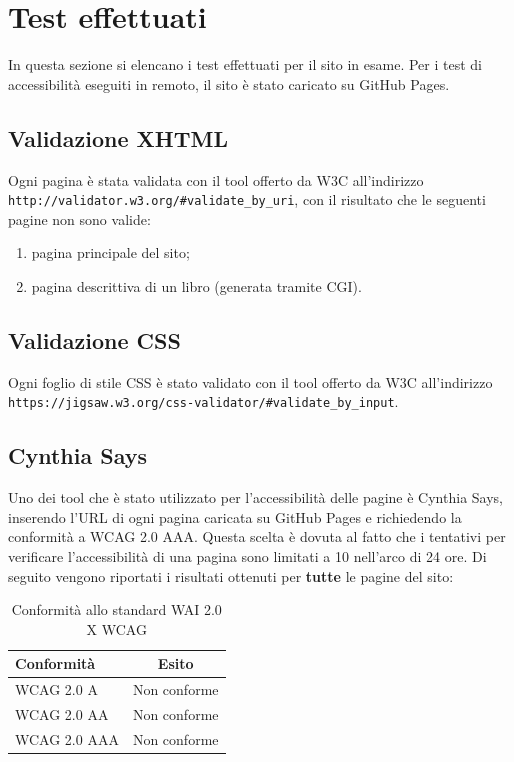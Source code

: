 \section{Test effettuati} %
In questa sezione si elencano i test effettuati per il sito in esame.
Per i test di accessibilità eseguiti in remoto, il sito è stato caricato su
GitHub Pages.

\subsection{Validazione XHTML} %
Ogni pagina è stata validata con il tool offerto da W3C all'indirizzo
\texttt{http://validator.w3.org/\#validate\_by\_uri}, con il risultato che
le seguenti pagine non sono valide:
\begin{enumerate}
\item pagina principale del sito;
\item pagina descrittiva di un libro (generata tramite CGI).
\end{enumerate}

\subsection{Validazione CSS}
Ogni foglio di stile CSS è stato validato con il tool offerto da W3C
all'indirizzo
\texttt{https://jigsaw.w3.org/css-validator/\#validate\_by\_input}.

\subsection{Cynthia Says} %
Uno dei tool che è stato utilizzato per l'accessibilità delle pagine è Cynthia
Says, inserendo l'URL di ogni pagina caricata su GitHub Pages e richiedendo la
conformità a WCAG 2.0 AAA. Questa scelta è dovuta al fatto che i tentativi per
verificare l'accessibilità di una pagina sono limitati a 10 nell'arco di 24
ore.
Di seguito vengono riportati i risultati ottenuti per \textbf{tutte} le pagine
del sito:

\begin{table}[h!]
\begin{center}
\begin{tabular}{ | l | c | }
  \hline
  Conformità & Esito \\
  \hline
  WCAG 2.0 A & Non conforme \\
  \hline
  WCAG 2.0 AA & Non conforme \\
  \hline
  WCAG 2.0 AAA & Non conforme \\
  \hline
\end{tabular}
\caption{Conformità allo standard WAI 2.0 X WCAG}
\end{center}
\end{table}

